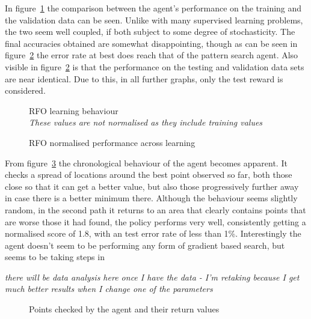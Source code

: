 In figure~\ref{fig:opt1full} the comparison between the agent's performance on the training and the validation data can be seen. Unlike with many supervised learning problems, the two seem well coupled, if both subject to some degree of stochasticity. The final accuracies obtained are somewhat disappointing, though as can be seen in figure~\ref{fig:opt1norm} the error rate at best does reach that of the pattern search agent. Also visible in figure~\ref{fig:opt1norm} is that the performance on the testing and validation data sets are near identical. Due to this, in all further graphs, only the test reward is considered.

\begin{figure}
\centering

\caption{RFO learning behaviour \\ \emph{These values are not normalised as they include training values}}
\label{fig:opt1full}
\end{figure}
\begin{figure}
\centering

\caption{RFO normalised performance across learning}
\label{fig:opt1norm}
\end{figure}



From figure~\ref{fig:locexp} the chronological behaviour of the agent becomes apparent. It checks a spread of locations around the best point observed so far, both those close so that it can get a better value, but also those progressively further away in case there is a better minimum there. Although the behaviour seems slightly random, in the second path it returns to an area that clearly contains points that are worse those it had found, the policy performs very well, consistently getting a normalised score of 1.8, with an test error rate of less than 1\%. Interestingly the agent doesn't seem to be performing any form of gradient based search, but seems to be taking steps in 

\emph{there will be data analysis here once I have the data - I'm retaking because I get much better results when I change one of the parameters}


\begin{figure}
\centering

\caption{Points checked by the agent and their return values}
\label{fig:locexp}
\end{figure}

